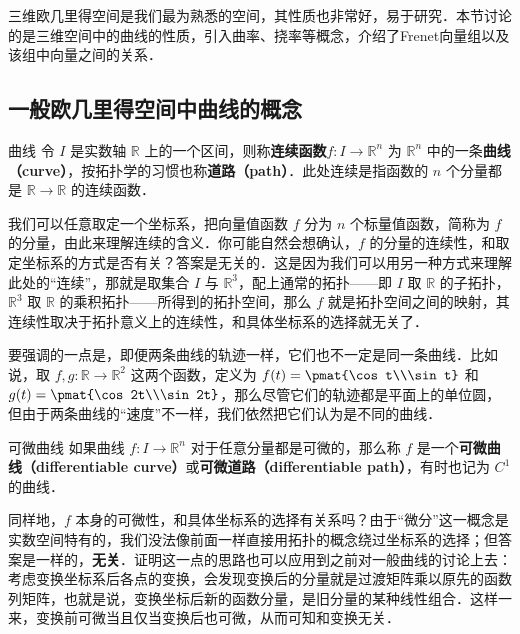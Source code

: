 

三维欧几里得空间是我们最为熟悉的空间，其性质也非常好，易于研究．本节讨论的是三维空间中的曲线的性质，引入曲率、挠率等概念，介绍了Frenet向量组以及该组中向量之间的关系．

\subsection{一般欧几里得空间中曲线的概念}

\begin{definition}{曲线}
令 $I$ 是实数轴 $\mathbb{R}$ 上的一个区间，则称\textbf{连续函数}$f:I\to \mathbb{R}^n$ 为 $\mathbb{R}^n$ 中的一条\textbf{曲线（curve）}，按拓扑学的习惯也称\textbf{道路（path）}．此处连续是指函数的 $n$ 个分量都是 $\mathbb{R}\to\mathbb{R}$ 的连续函数．
\end{definition}

我们可以任意取定一个坐标系，把向量值函数 $f$ 分为 $n$ 个标量值函数，简称为 $f$ 的分量，由此来理解连续的含义．你可能自然会想确认，$f$ 的分量的连续性，和取定坐标系的方式是否有关？答案是无关的．这是因为我们可以用另一种方式来理解此处的“连续”，那就是取集合 $I$ 与 $\mathbb{R}^3$，配上通常的拓扑——即 $I$ 取 $\mathbb{R}$ 的子拓扑，$\mathbb{R}^3$ 取 $\mathbb{R}$ 的乘积拓扑——所得到的拓扑空间，那么 $f$ 就是拓扑空间之间的映射，其连续性取决于拓扑意义上的连续性，和具体坐标系的选择就无关了．

要强调的一点是，即便两条曲线的轨迹一样，它们也不一定是同一条曲线．比如说，取 $f, g:\mathbb{R}\to\mathbb{R}^2$ 这两个函数，定义为 $f(t)=\pmat{\cos t\\\sin t}$ 和 $g(t)=\pmat{\cos 2t\\\sin 2t}$，那么尽管它们的轨迹都是平面上的单位圆，但由于两条曲线的“速度”不一样，我们依然把它们认为是不同的曲线．

\begin{definition}{可微曲线}
如果曲线 $f:I\to\mathbb{R}^n$ 对于任意分量都是可微的，那么称 $f$ 是一个\textbf{可微曲线（differentiable curve）}或\textbf{可微道路（differentiable path）}，有时也记为 $C^1$ 的曲线．
\end{definition}

同样地，$f$ 本身的可微性，和具体坐标系的选择有关系吗？由于“微分”这一概念是实数空间特有的，我们没法像前面一样直接用拓扑的概念绕过坐标系的选择；但答案是一样的，\textbf{无关}．证明这一点的思路也可以应用到之前对一般曲线的讨论上去：考虑变换坐标系后各点的变换，会发现变换后的分量就是过渡矩阵乘以原先的函数列矩阵，也就是说，变换坐标后新的函数分量，是旧分量的某种线性组合．这样一来，变换前可微当且仅当变换后也可微，从而可知和变换无关．

